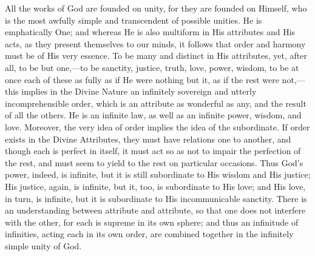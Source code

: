 All the works of God are founded on unity, for they
are founded on Himself, who is the most awfully simple
and transcendent of possible unities. He is emphatically
One; and whereas He is also multiform in His attributes
and His acts, as they present themselves to our minds, it
follows that order and harmony must be of His very
essence. To be many and distinct in His attributes, yet,
after all, to be but one,—to be sanctity, justice,
truth, love, power, wisdom, to be at once each of these
as fully as if He were nothing but it, as if the rest
were not,—this implies in the Divine Nature an
infinitely sovereign and utterly incomprehensible order,
which is an attribute as wonderful as any, and the result
of all the others. He is an infinite law, as well as an
infinite power, wisdom, and love. Moreover, the very idea
of order implies the idea of the subordinate. If order
exists in the Divine Attributes, they must have relations
one to another, and though each is perfect in itself, it
must act so as not to impair the perfection of the rest,
and must seem to yield to the rest on particular
occasions. Thus God's power, indeed, is infinite, but it
is still subordinate to His wisdom and His justice; His
justice, again, is infinite, but it, too, is subordinate
to His love; and His love, in turn, is infinite, but it
is subordinate to His incommunicable sanctity. There is
an understanding between attribute and attribute, so that
one does not interfere with the other, for each is
supreme in its own sphere; and thus an infinitude of
infinities, acting each in its own order, are combined
together in the infinitely simple unity of God.


